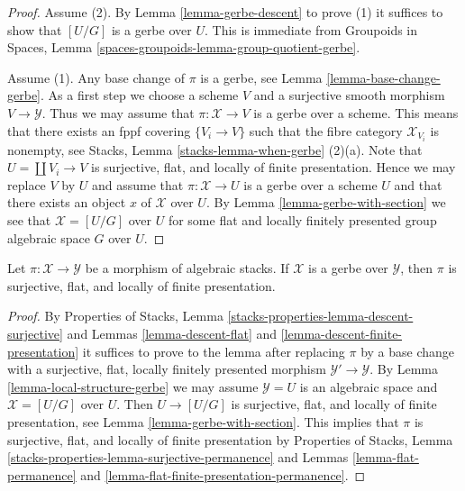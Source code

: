 \begin{proof}
Assume (2). By
Lemma \ref{lemma-gerbe-descent}
to prove (1) it suffices to show that $[U/G]$ is a gerbe over $U$.
This is immediate from
Groupoids in Spaces, Lemma \ref{spaces-groupoids-lemma-group-quotient-gerbe}.

\medskip\noindent
Assume (1). Any base change of $\pi$ is a gerbe, see
Lemma \ref{lemma-base-change-gerbe}.
As a first step we choose a scheme $V$ and a surjective smooth morphism
$V \to \mathcal{Y}$. Thus we may assume that $\pi : \mathcal{X} \to V$
is a gerbe over a scheme. This means that there exists an
fppf covering $\{V_i \to V\}$ such that the fibre category
$\mathcal{X}_{V_i}$ is nonempty, see
Stacks, Lemma \ref{stacks-lemma-when-gerbe} (2)(a).
Note that $U = \coprod V_i \to V$ is surjective, flat, and
locally of finite presentation. Hence we may replace $V$ by $U$ and
assume that $\pi : \mathcal{X} \to U$ is a gerbe over a scheme $U$ and
that there exists an object $x$ of $\mathcal{X}$ over $U$. By
Lemma \ref{lemma-gerbe-with-section}
we see that $\mathcal{X} = [U/G]$ over $U$ for some flat
and locally finitely presented group algebraic space $G$ over $U$.
\end{proof}

\begin{lemma}
\label{lemma-gerbe-fppf}
Let $\pi : \mathcal{X} \to \mathcal{Y}$ be a morphism of algebraic stacks.
If $\mathcal{X}$ is a gerbe over $\mathcal{Y}$, then $\pi$ is surjective,
flat, and locally of finite presentation.
\end{lemma}

\begin{proof}
By
Properties of Stacks, Lemma
\ref{stacks-properties-lemma-descent-surjective}
and
Lemmas \ref{lemma-descent-flat} and
\ref{lemma-descent-finite-presentation}
it suffices to prove to the lemma after replacing $\pi$ by a base change
with a surjective, flat, locally finitely presented morphism
$\mathcal{Y}' \to \mathcal{Y}$. By
Lemma \ref{lemma-local-structure-gerbe}
we may assume $\mathcal{Y} = U$ is an algebraic space and
$\mathcal{X} = [U/G]$ over $U$.
Then $U \to [U/G]$ is surjective, flat, and
locally of finite presentation, see
Lemma \ref{lemma-gerbe-with-section}.
This implies that $\pi$ is surjective, flat, and locally
of finite presentation by
Properties of Stacks,
Lemma \ref{stacks-properties-lemma-surjective-permanence}
and
Lemmas \ref{lemma-flat-permanence} and
\ref{lemma-flat-finite-presentation-permanence}.
\end{proof}

